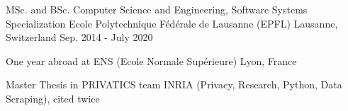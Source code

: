 


\begin{cventries}
	
	\cventry
	{MSc. and BSc. Computer Science and Engineering, Software Systems Specialization} %
	{Ecole Polytechnique Fédérale de Lausanne (EPFL)} %
	{Lausanne, Switzerland} %
	{Sep. 2014 - July 2020} %
	{ %
		\begin{cvitems}
			\item {One year abroad at ENS (Ecole Normale Supérieure) Lyon, France}
			\item {Master Thesis in PRIVATICS team INRIA (Privacy, Research, Python, Data Scraping), cited twice}
		\end{cvitems}
	}
	
	
	
	
\end{cventries}